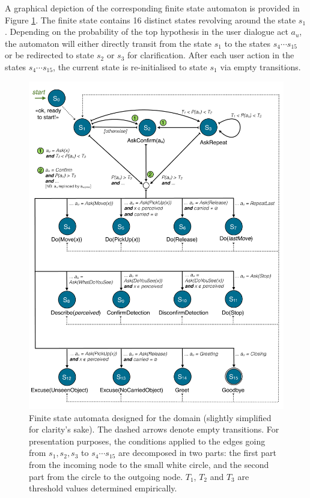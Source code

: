 A graphical depiction of the corresponding finite state automaton is provided in Figure \ref{fig:fsa-exp3}.  The finite state contains 16 distinct states revolving around the state $s_1$.  Depending on the probability of the top hypothesis in the user dialogue act $a_u$, the automaton will either directly transit from the state $s_1$ to the states $s_4 \cdots s_{15}$ or be redirected to state $s_2$ or $s_3$ for clarification. After each user action in the states $s_4 \cdots s_{15}$, the current state is re-initialised to state $s_1$ via empty transitions. 


\begin{figure}[p]
\centering
\includegraphics[scale=0.36]{imgs/fsa-exp3.pdf} 
\caption{Finite state automata designed for the domain (slightly simplified for clarity's sake). The dashed arrows denote empty transitions. For presentation purposes, the conditions applied to the edges going from $s_1,s_2,s_3$ to $s_4 \cdots s_{15}$ are decomposed in two parts: the first part from the incoming node to the small white circle, and the second part from the circle to the outgoing node. $T_1$, $T_2$ and $T_3$ are threshold values determined empirically.}
\label{fig:fsa-exp3}
\end{figure}


